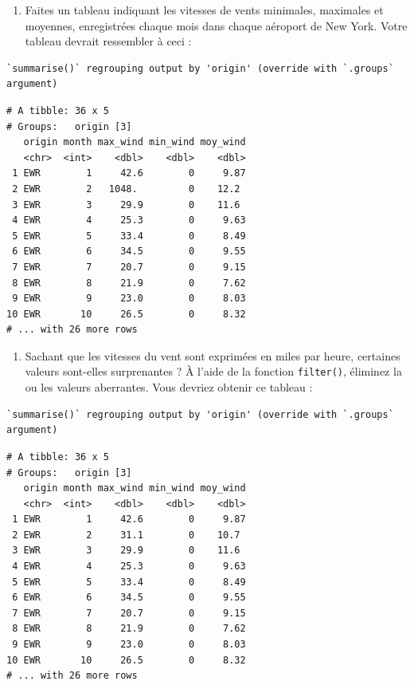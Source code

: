\documentclass[
  a4paper,
]{article}
\providecommand{\tightlist}{%
  \setlength{\itemsep}{0pt}\setlength{\parskip}{0pt}}
\begin{document}
\begin{enumerate}
\def\labelenumi{\arabic{enumi}.}
\setcounter{enumi}{1}
\tightlist
\item
  Faites un tableau indiquant les vitesses de vents minimales, maximales et moyennes, enregistrées chaque mois dans chaque aéroport de New York. Votre tableau devrait ressembler à ceci :
\end{enumerate}

\begin{verbatim}
`summarise()` regrouping output by 'origin' (override with `.groups` argument)
\end{verbatim}

\begin{verbatim}
# A tibble: 36 x 5
# Groups:   origin [3]
   origin month max_wind min_wind moy_wind
   <chr>  <int>    <dbl>    <dbl>    <dbl>
 1 EWR        1     42.6        0     9.87
 2 EWR        2   1048.         0    12.2 
 3 EWR        3     29.9        0    11.6 
 4 EWR        4     25.3        0     9.63
 5 EWR        5     33.4        0     8.49
 6 EWR        6     34.5        0     9.55
 7 EWR        7     20.7        0     9.15
 8 EWR        8     21.9        0     7.62
 9 EWR        9     23.0        0     8.03
10 EWR       10     26.5        0     8.32
# ... with 26 more rows
\end{verbatim}

\begin{enumerate}
\def\labelenumi{\arabic{enumi}.}
\setcounter{enumi}{2}
\tightlist
\item
  Sachant que les vitesses du vent sont exprimées en miles par heure, certaines valeurs sont-elles surprenantes ? À l'aide de la fonction \texttt{filter()}, éliminez la ou les valeurs aberrantes. Vous devriez obtenir ce tableau :
\end{enumerate}

\begin{verbatim}
`summarise()` regrouping output by 'origin' (override with `.groups` argument)
\end{verbatim}

\begin{verbatim}
# A tibble: 36 x 5
# Groups:   origin [3]
   origin month max_wind min_wind moy_wind
   <chr>  <int>    <dbl>    <dbl>    <dbl>
 1 EWR        1     42.6        0     9.87
 2 EWR        2     31.1        0    10.7 
 3 EWR        3     29.9        0    11.6 
 4 EWR        4     25.3        0     9.63
 5 EWR        5     33.4        0     8.49
 6 EWR        6     34.5        0     9.55
 7 EWR        7     20.7        0     9.15
 8 EWR        8     21.9        0     7.62
 9 EWR        9     23.0        0     8.03
10 EWR       10     26.5        0     8.32
# ... with 26 more rows
\end{verbatim}
\end{document}
